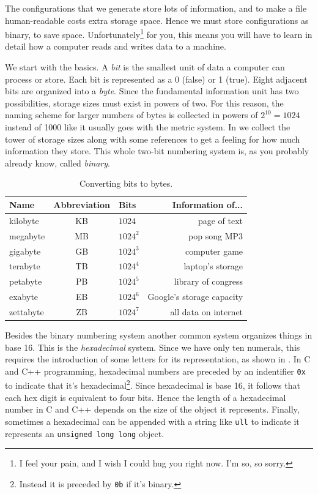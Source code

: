 The configurations that we generate store lots of information, and to make a
file human-readable costs extra storage space. Hence we must store
configurations as binary, to save space. Unfortunately\footnote{I feel your
pain, and I wish I could hug you right now. I'm so, so sorry.} for you,
this means you will have to learn in detail how a computer reads and writes data
to a machine.

We start with the basics. A {\it bit} is the smallest unit of data a computer
can process or store. Each bit is represented as a 0 (false) or 1 (true).
Eight adjacent bits are organized into a {\it byte}.
Since the fundamental information unit has two possibilities, storage
sizes must exist in powers of two. For this reason, the naming scheme
for larger numbers of bytes is collected in powers of $2^{10}=1024$
instead of 1000 like it usually goes with the metric system.
In  we collect the tower of storage sizes
along with some references to get a feeling for how much information
they store. This whole two-bit numbering system is, as you probably
already know, called {\it binary}.

\begin{table}
\centering
\caption{Converting bits to bytes.}
\begin{tabularx}{\linewidth}{lCLr}
\hline\hline
Name & Abbreviation & Bits & Information of...\\
\hline
kilobyte & KB & $1024$ & page of text \\
megabyte & MB & $1024^2$ & pop song MP3 \\
gigabyte & GB & $1024^3$ & computer game \\
terabyte & TB & $1024^4$ & laptop's storage \\
petabyte & PB & $1024^5$ & library of congress \\
exabyte  & EB & $1024^6$ & Google's storage capacity \\
zettabyte  & ZB & $1024^7$ & all data on internet \\
\hline\hline
\end{tabularx}
\label{tab:byte}
\end{table}

Besides the binary numbering system another common system organizes things in
base 16. This is the {\it hexadecimal} system. Since we have only ten numerals,
this requires the introduction of some letters for its representation,
as shown in . In C and C++ programming,
hexadecimal numbers are preceded by an indentifier \texttt{0x} to
indicate that it's hexadecimal\footnote{Instead it is preceded
by \texttt{0b} if it's binary.}.
Since hexadecimal is base 16, it follows that each hex digit is equivalent
to four bits. Hence the length of a hexadecimal number in C and C++
depends on the size of the object it represents. Finally, sometimes
a hexadecimal can be appended with a string like \texttt{ull} to
indicate it represents an \texttt{unsigned long long} object. 

